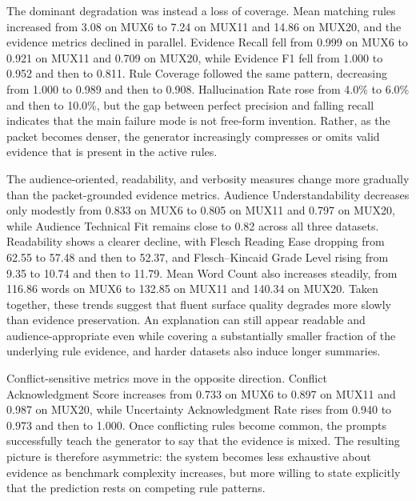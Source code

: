 \documentclass[sigconf,nonacm]{acmart}
\begin{document}
The dominant degradation was instead a loss of coverage. Mean matching rules increased from 3.08 on MUX6 to 7.24 on MUX11 and 14.86 on MUX20, and the evidence metrics declined in parallel. Evidence Recall fell from 0.999 on MUX6 to 0.921 on MUX11 and 0.709 on MUX20, while Evidence F1 fell from 1.000 to 0.952 and then to 0.811. Rule Coverage followed the same pattern, decreasing from 1.000 to 0.989 and then to 0.908. Hallucination Rate rose from 4.0\% to 6.0\% and then to 10.0\%, but the gap between perfect precision and falling recall indicates that the main failure mode is not free-form invention. Rather, as the packet becomes denser, the generator increasingly compresses or omits valid evidence that is present in the active rules.

The audience-oriented, readability, and verbosity measures change more gradually than the packet-grounded evidence metrics. Audience Understandability decreases only modestly from 0.833 on MUX6 to 0.805 on MUX11 and 0.797 on MUX20, while Audience Technical Fit remains close to 0.82 across all three datasets. Readability shows a clearer decline, with Flesch Reading Ease dropping from 62.55 to 57.48 and then to 52.37, and Flesch--Kincaid Grade Level rising from 9.35 to 10.74 and then to 11.79. Mean Word Count also increases steadily, from 116.86 words on MUX6 to 132.85 on MUX11 and 140.34 on MUX20. Taken together, these trends suggest that fluent surface quality degrades more slowly than evidence preservation. An explanation can still appear readable and audience-appropriate even while covering a substantially smaller fraction of the underlying rule evidence, and harder datasets also induce longer summaries.

Conflict-sensitive metrics move in the opposite direction. Conflict Acknowledgment Score increases from 0.733 on MUX6 to 0.897 on MUX11 and 0.987 on MUX20, while Uncertainty Acknowledgment Rate rises from 0.940 to 0.973 and then to 1.000. Once conflicting rules become common, the prompts successfully teach the generator to say that the evidence is mixed. The resulting picture is therefore asymmetric: the system becomes less exhaustive about evidence as benchmark complexity increases, but more willing to state explicitly that the prediction rests on competing rule patterns.
\end{document}
